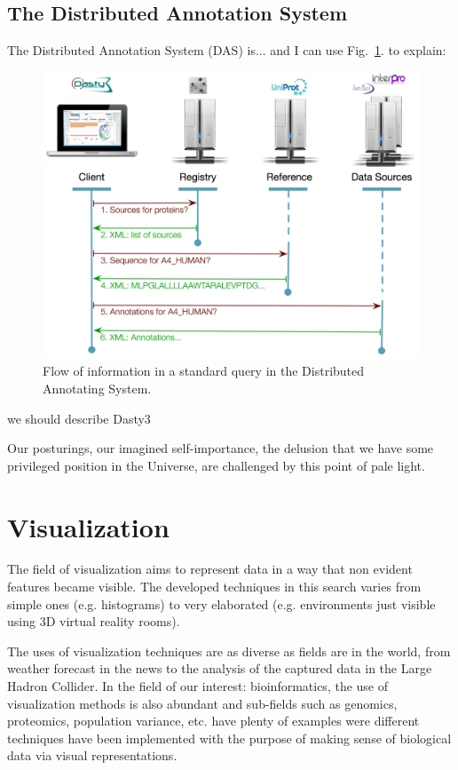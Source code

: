 \subsection{The Distributed Annotation System}
The Distributed Annotation System (DAS) is... \cite{JEN2008} and I can use Fig.~\ref{fig:das}. to explain:
\begin{figure}  
\includegraphics[width=\textwidth]{figures/DAS.png}
\caption[DAS Flow of Information.]{Flow of information in a standard query in the Distributed Annotating System.
\label{fig:das}}
\end{figure}
we should describe Dasty3 \cite{VIL2011}

\begin{savequote}[75mm] 
Our posturings, our imagined self-importance, the delusion that we have some privileged position in the Universe, are challenged by this point of pale light.
\end{savequote}
\section{Visualization}
The field of visualization aims to represent data in a way that non evident features became visible. The developed techniques in this search varies from simple ones (e.g. histograms) to very elaborated (e.g. environments just visible using 3D virtual reality rooms).

The uses of visualization techniques are as diverse as fields are in the world, from weather forecast in the news to the analysis of the captured data in the Large Hadron Collider. In the field of our interest: bioinformatics, the use of visualization methods is also abundant and sub-fields such as genomics, proteomics, population variance, etc. have plenty of examples were different techniques have been implemented with the purpose of making sense of biological data via visual representations.

